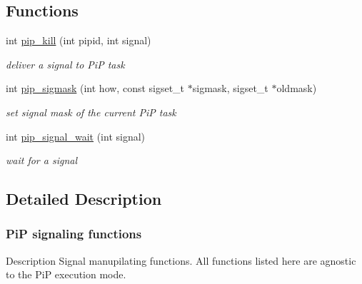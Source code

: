 \documentclass[twoside]{book}
\begin{document}
\subsection*{Functions}
\begin{DoxyCompactItemize}
\item 
int \hyperlink{group__pip-signal_ga4a396f38920d94b71dcfd3c898fbb82b}{pip\-\_\-kill} (int pipid, int signal)
\begin{DoxyCompactList}\small\item\em deliver a signal to Pi\-P task \end{DoxyCompactList}\item 
int \hyperlink{group__pip-signal_gaf546ee24368b118e937aadd2dbea2217}{pip\-\_\-sigmask} (int how, const sigset\-\_\-t $\ast$sigmask, sigset\-\_\-t $\ast$oldmask)
\begin{DoxyCompactList}\small\item\em set signal mask of the current Pi\-P task \end{DoxyCompactList}\item 
int \hyperlink{group__pip-signal_ga2048e7685a030e61e8c529c474899feb}{pip\-\_\-signal\-\_\-wait} (int signal)
\begin{DoxyCompactList}\small\item\em wait for a signal \end{DoxyCompactList}\end{DoxyCompactItemize}


\subsection{Detailed Description}
\hypertarget{pip-signal}{}\subsubsection{Pi\-P signaling functions}\label{pip-signal}
\begin{DoxyParagraph}{Description}
Signal manupilating functions. All functions listed here are agnostic to the Pi\-P execution mode. 
\end{DoxyParagraph}
\end{document}
